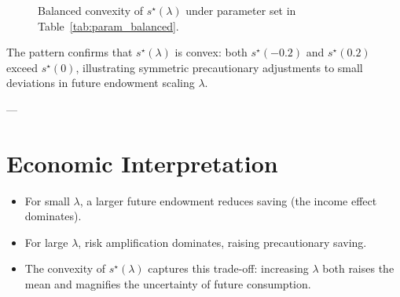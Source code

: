\documentclass[12pt]{article}
\begin{document}
\begin{figure}[h!]
    \centering
    \caption{Balanced convexity of $s^\star(\lambda)$ under parameter set in Table~\ref{tab:param_balanced}.}
    \label{fig:balanced_convexity}
    \end{figure}
    
    \noindent
    The pattern confirms that $s^\star(\lambda)$ is convex: both $s^\star(-0.2)$ and $s^\star(0.2)$ exceed $s^\star(0)$, 
    illustrating symmetric precautionary adjustments to small deviations in future endowment scaling $\lambda$.

---

\section{Economic Interpretation}

\begin{itemize}
    \item For small $\lambda$, a larger future endowment reduces saving (the income effect dominates).
    \item For large $\lambda$, risk amplification dominates, raising precautionary saving.
    \item The convexity of $s^\star(\lambda)$ captures this trade-off: 
    increasing $\lambda$ both raises the mean and magnifies the uncertainty of future consumption.
\end{itemize}
\end{document}
